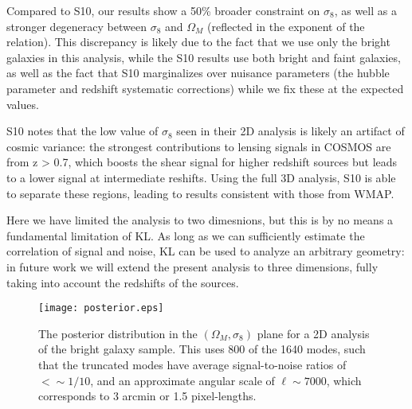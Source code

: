 Compared to S10, our results show a 50\% broader constraint on $\sigma_8$,
as well as a stronger degeneracy between $\sigma_8$ and $\Omega_M$ 
(reflected in the exponent of the relation).  This discrepancy is likely
due to the fact that we use only the bright galaxies in this analysis,
while the S10 results use both bright and faint galaxies, as well as the
fact that S10 marginalizes over nuisance parameters (the hubble parameter
and redshift systematic corrections) while we fix these at the  expected
values.

S10 notes that the low value of $\sigma_8$ seen in their 2D analysis is likely
an artifact of cosmic variance: the strongest contributions to lensing
signals in COSMOS are from z > 0.7, which boosts the shear signal for higher
redshift sources but leads to a lower signal at intermediate reshifts.
Using the full 3D analysis, S10 is able to separate these regions, leading
to results consistent with those from WMAP.

Here we have limited the analysis to two dimesnions, but this is by no means a
fundamental limitation of KL.  As long as we can sufficiently estimate the
correlation of signal and noise, KL can be used to analyze an arbitrary
geometry: in future work we will extend the present analysis to three
dimensions, fully taking into account the redshifts of the sources.

\begin{figure*}
 \centering
 \texttt{[image: posterior.eps]}
 \caption{The posterior distribution in the $(\Omega_M, \sigma_8)$ plane
   for a 2D analysis of the bright galaxy sample.  This uses 800 of the
   1640 modes, such that the truncated modes have average signal-to-noise
   ratios of $<\sim 1/10$, and an approximate angular scale of
   $\ell \sim 7000$, which corresponds to 3 arcmin or 1.5 pixel-lengths.}
 \label{fig:posterior}
\end{figure*}

